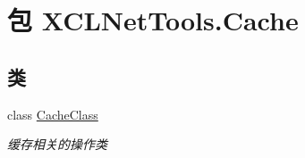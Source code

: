 \hypertarget{namespace_x_c_l_net_tools_1_1_cache}{\section{包 X\-C\-L\-Net\-Tools.\-Cache}
\label{namespace_x_c_l_net_tools_1_1_cache}
}
\subsection*{类}
\begin{DoxyCompactItemize}
\item 
class \hyperlink{class_x_c_l_net_tools_1_1_cache_1_1_cache_class}{Cache\-Class}
\begin{DoxyCompactList}\small\item\em 缓存相关的操作类 \end{DoxyCompactList}\end{DoxyCompactItemize}
